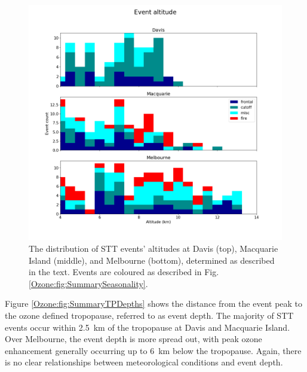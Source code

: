   \begin{figure}[t]
    \includegraphics[width=12cm]{Figures/Ozone/summary_altitude.png}
    \caption{The distribution of STT events' altitudes at Davis (top), Macquarie Island (middle), and Melbourne (bottom), determined as described in the text.
      Events are coloured as described in Fig. \ref{Ozone:fig:SummarySeasonality}.}
    \label{Ozone:fig:SummaryAltitudes}
  \end{figure}
  
  Figure \ref{Ozone:fig:SummaryTPDepths} shows the distance from the event peak to the ozone defined tropopause, referred to as event depth.
  The majority of STT events occur within 2.5~km of the tropopause at Davis and Macquarie Island. 
  Over Melbourne, the event depth is more spread out, with peak ozone enhancement generally occurring up to 6~km below the tropopause.
  Again, there is no clear relationships between meteorological conditions and event depth.
  

